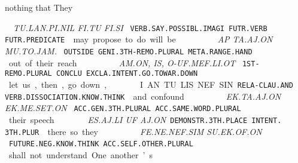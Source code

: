 {nothing 	that		They 	 

\drie 

 
\tu\lan\Atlanpi\Atlannil~\Atlanfi\tu~\Atlanfi\si

{\it TU.LAN.PI.NIL		               FI.TU		FI.SI }

{\tt VERB.SAY.POSSIBL.IMAGI	FUTR.VERB	FUTR.PREDICATE }

may propose			to do		will be 
\drie 

  

\ap~\ta\aj\on~\Atlanmu\Atlanto\jam\period

{\it AP		TA.AJ.ON			MU.TO.JAM. }

{\tt OUTSIDE	GENI.3TH-REMO.PLURAL	META.RANGE.HAND }

out 		of their 				reach.
\drie

  
\am\on~\is~\Atlano\uf\mef\li\ot

{\it AM.ON,     IS,   O-UF.MEF.LI.OT				 }

{\tt 1ST-REMO.PLURAL CONCLU EXCLA.INTENT.GO.TOWAR.DOWN             }

let us, then, go down, 			      	 

\drie
 

\Atlani\an~\tu\lis\nef\Atlansin

I.AN			TU.LIS.NEF.SIN      

{\tt RELA-CLAU.AND	VERB.DISSOCIATION.KNOW.THINK }

and  			confound 

\drie

\ek\ta\aj\on~\ek\me\set\on

{\it EK.TA.AJ.ON		EK.ME.SET.ON }

{\tt ACC.GEN.3TH.PLURAL             ACC.SAME.WORD.PLURAL	 	}

their 			speech

\drie

  

\es\aj\lu~\uf~\aj\on

{\it ES.AJ.LI				UF		AJ.ON}				 
{\tt DEMONSTR.3TH.PLACE        INTENT.		3TH.PLUR	 }


there			so 			they 		

\drie

\fe\Atlanne\nef\Atlansim~\su\ek\of\on

{\it FE.NE.NEF.SIM			SU.EK.OF.ON	 }

{\tt FUTURE.NEG.KNOW.THINK		ACC.SELF.OTHER.PLURAL }

shall not understand 		One another’s 

\drie

}
